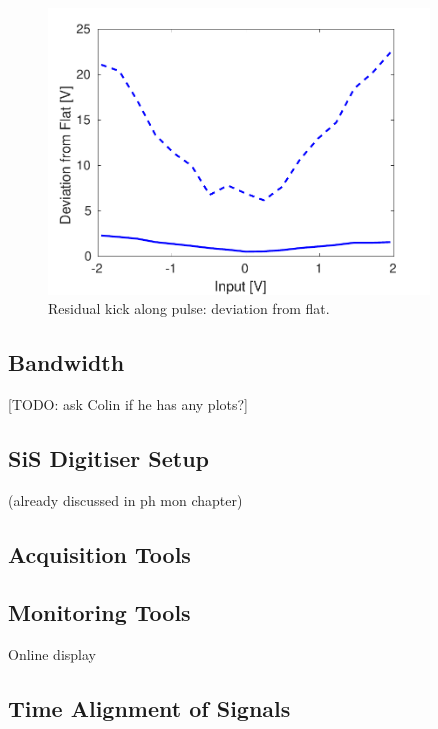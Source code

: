 \begin{figure}
  \centering
  \includegraphics[width=0.9\textwidth]{Figures/commissioning/residualKick_Flatness}
  \caption{Residual kick along pulse: deviation from flat.}
  \label{f:ampClosureFlatness}
\end{figure}

\subsection{Bandwidth}
\label{ss:ampBand}

[TODO: ask Colin if he has any plots?]


\subsection{SiS Digitiser Setup}
\label{ss:sisSetup}

(already discussed in ph mon chapter)

\subsection{Acquisition Tools}
\label{ss:acqTools}

\subsection{Monitoring Tools}
\label{ss:monTools}

Online display

\subsection{Time Alignment of Signals}
\label{ss:timeAlignment}

